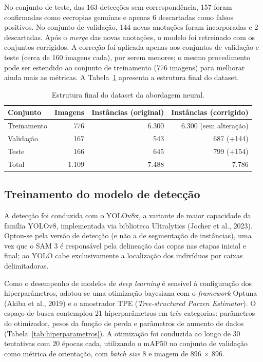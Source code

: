 \documentclass[12pt, a4paper]{article}
\begin{document}
No conjunto de teste, das 163 detecções sem correspondência, 157 foram confirmadas
como cecropias genuínas e apenas 6 descartadas como falsos positivos. No conjunto
de validação, 144 novas anotações foram incorporadas e 2 descartadas. Após o
\textit{merge} das novas anotações, o modelo foi retreinado com os conjuntos
corrigidos. A correção foi aplicada apenas aos conjuntos de validação e teste (cerca
de 160 imagens cada), por serem menores; o mesmo procedimento pode ser estendido ao
conjunto de treinamento (776 imagens) para melhorar ainda mais as métricas. A
Tabela~\ref{tab:dataset-dl} apresenta a estrutura final do dataset.

\begin{table}[H]
\centering
\caption{Estrutura final do dataset da abordagem neural.}
\label{tab:dataset-dl}
\begin{tabular}{lrrr}
\toprule
\textbf{Conjunto} & \textbf{Imagens} & \textbf{Instâncias (original)} & \textbf{Instâncias (corrigido)} \\
\midrule
Treinamento & 776   & 6.300 & 6.300 (sem alteração) \\
Validação   & 167   & 543   & 687 (+144) \\
Teste       & 166   & 645   & 799 (+154) \\
\midrule
Total       & 1.109 & 7.488 & 7.786 \\
\bottomrule
\end{tabular}
\end{table}

\subsection{Treinamento do modelo de detecção}

A detecção foi conduzida com o YOLOv8x, a variante de maior capacidade da família
YOLOv8, implementada via biblioteca Ultralytics (Jocher et al., 2023). Optou-se
pela versão de detecção (e não a de segmentação de instâncias), uma vez que o
SAM 3 é responsável pela delineação das copas nas etapas inicial e final; ao YOLO
cabe exclusivamente a localização dos indivíduos por caixas delimitadoras.

Como o desempenho de modelos de \textit{deep learning} é sensível à configuração
dos hiperparâmetros, adotou-se uma otimização bayesiana com o \textit{framework}
Optuna (Akiba et al., 2019) e o amostrador TPE (\textit{Tree-structured Parzen
Estimator}). O espaço de busca contemplou 21 hiperparâmetros em três categorias:
parâmetros do otimizador, pesos da função de perda e parâmetros de aumento de dados
(Tabela~\ref{tab:hiperparametros}). A otimização foi conduzida ao longo de 30
tentativas com 20 épocas cada, utilizando o mAP50 no conjunto de validação como
métrica de orientação, com \textit{batch size} 8 e imagem de 896 $\times$ 896.
\end{document}
